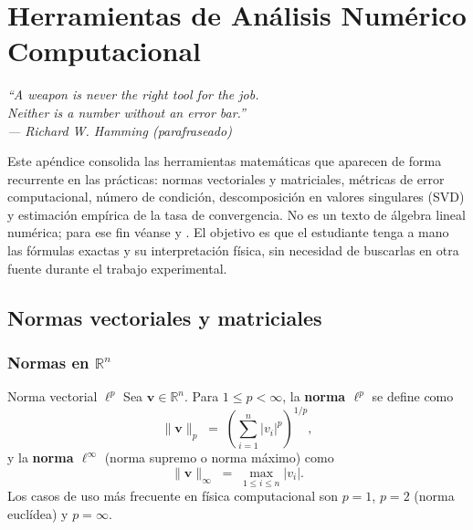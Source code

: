 %
\chapter{Herramientas de Análisis Numérico Computacional}
\label{ap:herramientas}

\begin{flushright}
\itshape
``A weapon is never the right tool for the job.\\
Neither is a number without an error bar.''\\[2pt]
\upshape --- Richard W. Hamming (parafraseado)
\end{flushright}
\bigskip

Este apéndice consolida las herramientas matemáticas que aparecen de forma
recurrente en las prácticas: normas vectoriales y matriciales, métricas de
error computacional, número de condición, descomposición en valores singulares
(SVD) y estimación empírica de la tasa de convergencia. No es un texto de
álgebra lineal numérica; para ese fin véanse \cite{golub2013matrix} y
\cite{higham2002accuracy}. El objetivo es que el estudiante tenga a mano
las fórmulas exactas y su interpretación física, sin necesidad de buscarlas
en otra fuente durante el trabajo experimental.

\section{Normas vectoriales y matriciales}
\label{ap:normas}

\subsection{Normas en \texorpdfstring{$\mathbb{R}^n$}{Rn}}
\label{ap:normas_vec}

\begin{definicion}{Norma vectorial $\ell^p$}
\label{def:norma_lp}
Sea $\mathbf{v} \in \mathbb{R}^n$. Para $1 \leq p < \infty$, la
\textbf{norma $\ell^p$} se define como
\[
  \|\mathbf{v}\|_p \;=\; \left(\sum_{i=1}^{n} |v_i|^p\right)^{1/p},
\]
y la \textbf{norma $\ell^\infty$} (norma supremo o norma máximo) como
\[
  \|\mathbf{v}\|_\infty \;=\; \max_{1 \leq i \leq n} |v_i|.
\]
Los casos de uso más frecuente en física computacional son $p=1$, $p=2$
(norma euclídea) y $p=\infty$.
\end{definicion}

